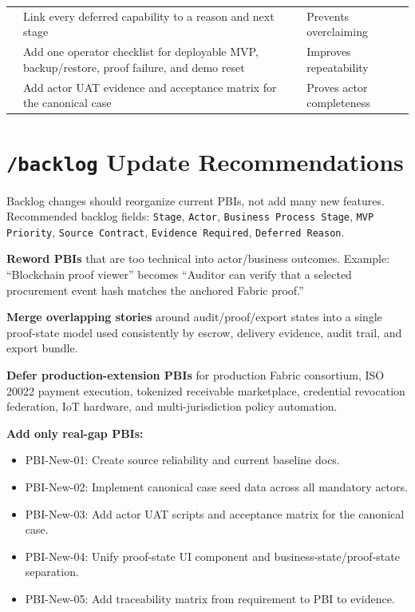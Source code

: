 \documentclass[conference]{IEEEtran}
\begin{document}
\begin{table}[t]
\begin{tabularx}{\textwidth}{P{4.2cm} P{5.4cm} Y}
 & Link every deferred capability to a reason and next stage & Prevents overclaiming \\
 & Add one operator checklist for deployable MVP, backup/restore, proof failure, and demo reset & Improves repeatability \\
 & Add actor UAT evidence and acceptance matrix for the canonical case & Proves actor completeness \\
\bottomrule
\end{tabularx}
\end{table}

\section{\texorpdfstring{\texttt{/backlog} Update Recommendations}{/backlog Update Recommendations}}
Backlog changes should reorganize current PBIs, not add many new features. Recommended backlog fields: \texttt{Stage}, \texttt{Actor}, \texttt{Business Process Stage}, \texttt{MVP Priority}, \texttt{Source Contract}, \texttt{Evidence Required}, \texttt{Deferred Reason}.

\textbf{Reword PBIs} that are too technical into actor/business outcomes. Example: ``Blockchain proof viewer'' becomes ``Auditor can verify that a selected procurement event hash matches the anchored Fabric proof.''

\textbf{Merge overlapping stories} around audit/proof/export states into a single proof-state model used consistently by escrow, delivery evidence, audit trail, and export bundle.

\textbf{Defer production-extension PBIs} for production Fabric consortium, ISO 20022 payment execution, tokenized receivable marketplace, credential revocation federation, IoT hardware, and multi-jurisdiction policy automation.

\textbf{Add only real-gap PBIs:}
\begin{itemize}
  \item PBI-New-01: Create source reliability and current baseline docs.
  \item PBI-New-02: Implement canonical case seed data across all mandatory actors.
  \item PBI-New-03: Add actor UAT scripts and acceptance matrix for the canonical case.
  \item PBI-New-04: Unify proof-state UI component and business-state/proof-state separation.
  \item PBI-New-05: Add traceability matrix from requirement to PBI to evidence.
\end{itemize}
\end{document}
